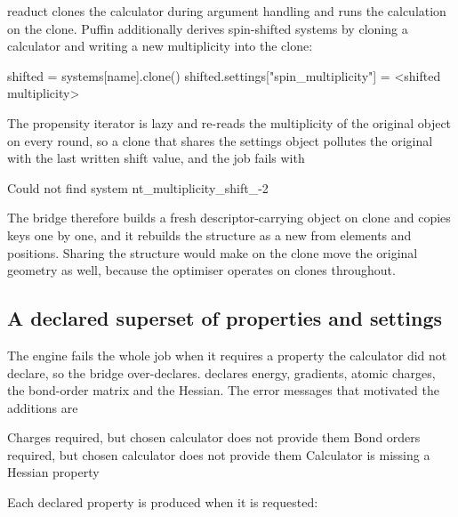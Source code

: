 readuct clones the calculator during argument handling and runs the
calculation on the clone.  Puffin additionally derives spin-shifted systems by
cloning a calculator and writing a new multiplicity into the clone:

\begin{excerpt}
shifted = systems[name].clone()
shifted.settings["spin_multiplicity"] = <shifted multiplicity>
\end{excerpt}

The propensity iterator is lazy and re-reads the multiplicity of the original
object on every round, so a clone that shares the settings object pollutes the
original with the last written shift value, and the job fails with

\begin{transcript}
Could not find system nt_multiplicity_shift_-2
\end{transcript}

The bridge therefore builds a fresh descriptor-carrying  object
on clone and copies keys one by one, and it rebuilds the structure as a new
 from elements and positions.  Sharing the structure
would make  on the clone move the original
geometry as well, because the optimiser operates on clones throughout.

\subsection{A declared superset of properties and settings}
\label{sec:superset}

The engine fails the whole job when it requires a property the calculator did
not declare, so the bridge over-declares.  
declares energy, gradients, atomic charges, the bond-order matrix and the
Hessian.  The error messages that motivated the additions are

\begin{transcript}
Charges required, but chosen calculator does not provide them
Bond orders required, but chosen calculator does not provide them
Calculator is missing a Hessian property
\end{transcript}

Each declared property is produced when it is requested:

